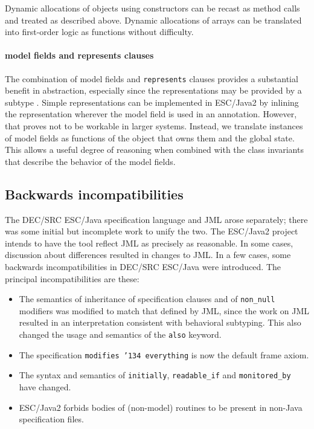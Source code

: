 \documentclass{llncs}
\begin{document}
Dynamic allocations of objects using constructors can be recast as
method calls and treated as described above.  Dynamic allocations of
arrays can be translated into first-order logic as functions without
difficulty.

\paragraph*{model fields and represents clauses}
The combination of model fields and \texttt{represents} clauses
provides a substantial benefit in abstraction, especially since the
representations may be provided by a subtype \cite{Cheon-etal03}.
Simple representations can be implemented in ESC/Java2 by inlining the
representation wherever the model field is used in an annotation.
However, that proves not to be workable in larger systems.  Instead,
we translate instances of model fields as functions of the object that
owns them and the global state.  This allows a useful degree of
reasoning when combined with the class invariants that describe the
behavior of the model fields.

\subsection{Backwards incompatibilities}
The DEC/SRC ESC/Java specification language and JML arose separately;
there was some initial but incomplete work to unify the two.  The
ESC/Java2 project intends to have the tool reflect JML as precisely as
reasonable.  In some cases, discussion about differences resulted in
changes to JML.  In a few cases, some backwards incompatibilities in
DEC/SRC ESC/Java were introduced.  The principal incompatibilities are
these:
\setlength{\partopsep}{0in}\setlength{\parskip}{0in}\setlength{\itemsep}{0in}\setlength{\topsep}{0in}
\begin{itemize}
\setlength{\partopsep}{0in}\setlength{\parskip}{0in}\setlength{\itemsep}{0in}\setlength{\topsep}{0in}
\item The semantics of inheritance of specification clauses and of
  \texttt{non\_null} modifiers was modified to match that defined by
  JML, since the work on JML resulted in an interpretation consistent
  with behavioral subtyping.  This also changed the usage and
  semantics of the \texttt{also} keyword.
\item The specification \texttt{modifies \char'134 everything} is now
  the default frame axiom.
\item The syntax and semantics of \texttt{initially},
  \texttt{readable\_if} and \texttt{monitored\_by} have changed.
\item ESC/Java2 forbids bodies of (non-model) routines to be present
  in non-Java specification files.
\end{itemize}
\end{document}
